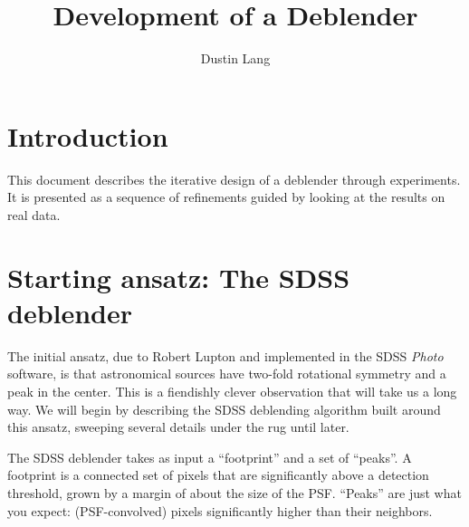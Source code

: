 \documentclass[10pt,letter]{article}
\author{Dustin Lang}
\title{Development of a Deblender}
\begin{document}
\maketitle

\section{Introduction}

This document describes the iterative design of a deblender through
experiments.  It is presented as a sequence of refinements guided by
looking at the results on real data.


%
% 



\section{Starting ansatz: The SDSS deblender}

The initial ansatz, due to Robert Lupton \cite{rhldeblend} and
implemented in the SDSS \emph{Photo} software, is that astronomical
sources have two-fold rotational symmetry and a peak in the center.
This is a fiendishly clever observation that will take us a long way.
We will begin by describing the SDSS deblending algorithm built around
this ansatz, sweeping several details under the rug until later.

The SDSS deblender takes as input a ``footprint'' and a set of
``peaks''.  A footprint is a connected set of pixels that are
significantly above a detection threshold, grown by a margin of about
the size of the PSF.  ``Peaks'' are just what you expect:
(PSF-convolved) pixels significantly higher than their neighbors.
\end{document}
